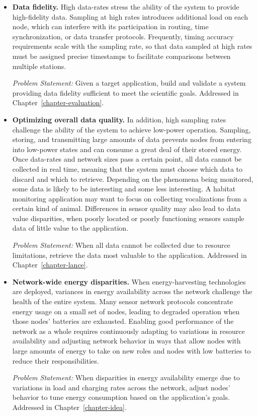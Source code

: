 \begin{itemize}

\item \textbf{Data fidelity.} High data-rates stress the ability of the
system to provide high-fidelity data. Sampling at high rates introduces
additional load on each node, which can interfere with its participation in
routing, time synchronization, or data transfer protocols. Frequently, timing
accuracy requirements scale with the sampling rate, so that data sampled at
high rates must be assigned precise timestamps to facilitate comparisons
between multiple stations.

\textit{Problem Statement:} Given a target application, build and validate a
system providing data fidelity sufficient to meet the scientific goals.
Addressed in Chapter~\ref{chapter-evaluation}.

\item \textbf{Optimizing overall data quality.} In addition, high sampling
rates challenge the ability of the system to achieve low-power operation.
Sampling, storing, and transmitting large amounts of data prevents nodes from
entering into low-power states and can consume a great deal of their stored
energy. Once data-rates and network sizes pass a certain point, all data
cannot be collected in real time, meaning that the system must choose which
data to discard and which to retrieve. Depending on the phenomena being
monitored, some data is likely to be interesting and some less interesting. A
habitat monitoring application may want to focus on collecting vocalizations
from a certain kind of animal. Differences in sensor quality may also lead to
data value disparities, when poorly located or poorly functioning sensors
sample data of little value to the application.

\textit{Problem Statement:} When all data cannot be collected due to resource
limitations, retrieve the data most valuable to the application. Addressed in
Chapter~\ref{chapter-lance}.

\item \textbf{Network-wide energy disparities.} When energy-harvesting
technologies are deployed, variances in energy availability across the
network challenge the health of the entire system. Many sensor network
protocols concentrate energy usage on a small set of nodes, leading to
degraded operation when those nodes' batteries are exhausted. Enabling good
performance of the network as a whole requires continuously adapting to
variations in resource availability and adjusting network behavior in ways
that allow nodes with large amounts of energy to take on new roles and nodes
with low batteries to reduce their responsibilities.

\textit{Problem Statement:} When disparities in energy availability emerge
due to variations in load and charging rates across the network, adjust
nodes' behavior to tune energy consumption based on the application's goals.
Addressed in Chapter~\ref{chapter-idea}.

\end{itemize}

